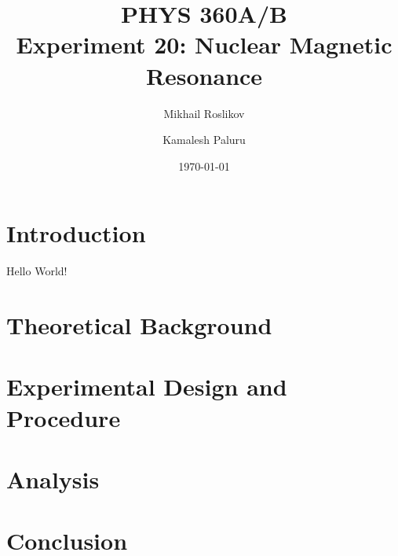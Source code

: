 \documentclass{article}
\title{PHYS 360A/B \\ Experiment 20: Nuclear Magnetic Resonance}
\author{Mikhail Roslikov \and Kamalesh Paluru}
\date{\today}
\begin{document}
\maketitle

\tableofcontents

\newpage

\begin{abstract}
\end{abstract}

\newpage

\section{Introduction}\label{sec:introduction}
Hello World!

\newpage

\section{Theoretical Background}\label{sec:theoretical-background}

\newpage

\section{Experimental Design and Procedure}\label{sec:experimental-design-and-procedure}

\newpage

\section{Analysis}\label{sec:analysis}

\newpage

\section{Conclusion}\label{sec:conclusion}
\end{document}
